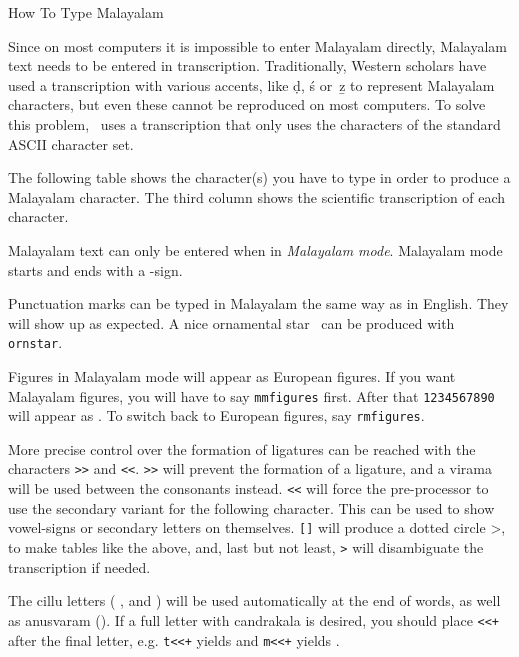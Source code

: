 \beginsection How To Type Malayalam

Since on most computers it is impossible to enter Malayalam directly,
Malayalam text needs to be entered in transcription. Traditionally,
Western scholars have used a transcription with various accents, like
{\mmtr \d d}, {\mmtr \'s} or~{\mmtr \b z} to represent Malayalam characters, but even
these cannot be reproduced on most computers. To solve this
problem, \MT\ uses a
transcription that only uses the characters of the standard
ASCII character set.

The following table shows the character(s) you have to type in order
to produce a Malayalam character. The third column shows the
scientific transcription of each character.

\bigskip

\bigskip

Malayalam text can only be entered when in {\it Malayalam mode}.
Malayalam mode starts and ends with a {\tt\dollar}-sign.

Punctuation marks can be typed in Malayalam the same way as in English.
They will show up as expected. A nice ornamental star
\ornstar\ can be produced with {\tt\bslash ornstar}.

Figures in Malayalam mode will appear as
European figures. If you want Malayalam figures, you will have to
say {\tt\bslash mmfigures} first. After that {\tt 1234567890} will
appear as {\mm \mmfigures {\mmone}{\mmtwo}{\mmthree}{\mmfour}{\mmfive}{\mmsix}{\mmseven}{\mmeight}{\mmnine}{\mmzero}\rmfigures}. To switch back to
European figures, say {\tt\bslash rmfigures}.

More precise control over the formation of ligatures can be reached with
the characters {\tt >>} and {\tt<<}. {\tt >>} will
prevent the formation of a ligature, and a virama will be used between
the consonants instead. {\tt<<} will force the
pre-processor to use the secondary variant for the following
character. This can be used to show vowel-signs or secondary letters
on themselves. {\tt []} will produce a dotted circle {\mm {}>}, to make
tables like the above, and, last but not least, {\tt >} will
disambiguate the transcription if needed.

The cillu letters ({\mm {}   }, and {\mm {}}) will be
used automatically at the end of words, as well as anusvaram ({\mm {}}).
If a full letter with candrakala is desired, you should
place {\tt <<+} after the final letter, e.g. {\tt t<<+} yields
{\mm {}} and {\tt m<<+} yields {\mm {}}.

